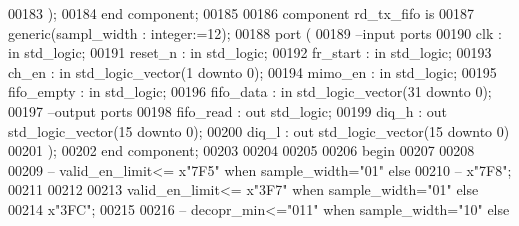 \begin{DoxyCode}
00183         );
00184 \textcolor{keywordflow}{end} \textcolor{keywordflow}{component};
00185 
00186 \textcolor{keywordflow}{component} rd_tx_fifo \textcolor{keywordflow}{is}
00187   \textcolor{keywordflow}{generic}(sampl_width : \textcolor{comment}{integer}:=\textcolor{vhdllogic}{}\textcolor{vhdllogic}{12});
00188   \textcolor{keywordflow}{port} (
00189 \textcolor{keyword}{        --input ports }
00190       clk           : \textcolor{keywordflow}{in} \textcolor{comment}{std\_logic};
00191       reset_n       : \textcolor{keywordflow}{in} \textcolor{comment}{std\_logic};
00192       fr_start      : \textcolor{keywordflow}{in} \textcolor{comment}{std\_logic};
00193       ch_en         : \textcolor{keywordflow}{in} \textcolor{comment}{std\_logic\_vector}(\textcolor{vhdllogic}{}\textcolor{vhdllogic}{1} \textcolor{keywordflow}{downto} \textcolor{vhdllogic}{}\textcolor{vhdllogic}{0});
00194       mimo_en       : \textcolor{keywordflow}{in} \textcolor{comment}{std\_logic};
00195       fifo_empty    : \textcolor{keywordflow}{in} \textcolor{comment}{std\_logic};
00196       fifo_data : \textcolor{keywordflow}{in} \textcolor{comment}{std\_logic\_vector}(\textcolor{vhdllogic}{}\textcolor{vhdllogic}{31} \textcolor{keywordflow}{downto} \textcolor{vhdllogic}{}\textcolor{vhdllogic}{0});
00197 \textcolor{keyword}{        --output ports }
00198       fifo_read : \textcolor{keywordflow}{out} \textcolor{comment}{std\_logic};
00199       diq_h         : \textcolor{keywordflow}{out} \textcolor{comment}{std\_logic\_vector}(\textcolor{vhdllogic}{}\textcolor{vhdllogic}{15} \textcolor{keywordflow}{downto} \textcolor{vhdllogic}{}\textcolor{vhdllogic}{0});
00200       diq_l         : \textcolor{keywordflow}{out} \textcolor{comment}{std\_logic\_vector}(\textcolor{vhdllogic}{}\textcolor{vhdllogic}{15} \textcolor{keywordflow}{downto} \textcolor{vhdllogic}{}\textcolor{vhdllogic}{0})
00201         );
00202 \textcolor{keywordflow}{end} \textcolor{keywordflow}{component};
00203 
00204 
00205   
00206 \textcolor{vhdlkeyword}{begin}
00207   
00208   
00209 \textcolor{keyword}{-- valid\_en\_limit<= x"7F5" when sample\_width="01" else}
00210 \textcolor{keyword}{--                  x"7F8";}
00211 
00212                                 
00213   \textcolor{vhdlchar}{valid_en_limit}\textcolor{vhdlchar}{<=} \textcolor{vhdlchar}{x}\textcolor{vhdllogic}{"3F7"} \textcolor{keywordflow}{when} \textcolor{vhdlchar}{sample_width}\textcolor{vhdlchar}{=}\textcolor{vhdllogic}{"01"} \textcolor{keywordflow}{else}
00214                    \textcolor{vhdlchar}{x}\textcolor{vhdllogic}{"3FC"};
00215  
00216 \textcolor{keyword}{--  decopr\_min<="011" when sample\_width="10" else }

\end{DoxyCode}
